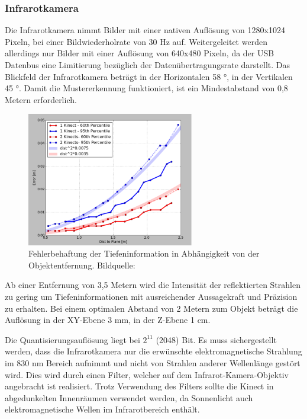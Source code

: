 \subsubsection{Infrarotkamera}
Die Infrarotkamera nimmt Bilder mit einer nativen Auflösung von 1280x1024 Pixeln, bei einer Bildwiederholrate von 30 Hz auf. Weitergeleitet werden allerdings nur Bilder mit einer Auflösung von 640x480 Pixeln, da der USB Datenbus eine Limitierung bezüglich der Datenübertragungsrate darstellt. Das Blickfeld der Infrarotkamera beträgt in der Horizontalen 58 °, in der Vertikalen 45 °. Damit die Mustererkennung funktioniert, ist ein Mindestabstand von 0,8 Metern erforderlich. \\
 \begin{figure}[!ht]
 	\begin{center}
 		\includegraphics[width=0.65\textwidth]{./Res/Res_to_Dist}
 	\end{center}
 	\caption{Fehlerbehaftung der Tiefeninformation in Abhängigkeit von der Objektentfernung. Bildquelle: \cite{kinectinfo}}
 	\label{fig:Res_to_Dist}
 \end{figure}
 
 Ab einer Entfernung von 3,5 Metern wird die Intensität der reflektierten Strahlen zu gering um Tiefeninformationen mit ausreichender Aussagekraft und Präzision zu erhalten.
Bei einem optimalen Abstand von 2 Metern zum Objekt beträgt die Auflösung 
in der XY-Ebene 3 mm, in der Z-Ebene 1 cm.





Die Quantisierungsauflösung liegt bei $2^ {11}$ (2048) Bit.
Es muss sichergestellt werden, dass die Infrarotkamera nur die erwünschte elektromagnetische Strahlung im 830 nm Bereich aufnimmt und nicht von Strahlen anderer Wellenlänge gestört wird. Dies wird durch einen Filter, welcher auf dem Infrarot-Kamera-Objektiv angebracht ist realisiert.
Trotz Verwendung des Filters sollte die Kinect in abgedunkelten Innenräumen verwendet werden, da Sonnenlicht auch elektromagnetische Wellen im Infrarotbereich enthält.

